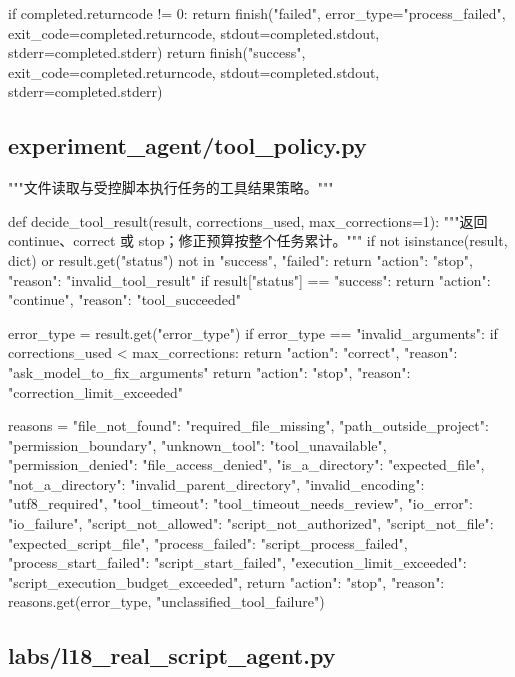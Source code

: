 \documentclass[UTF8,zihao=-4,fontset=fandol]{ctexart}
\begin{document}
\begin{Code}
    if completed.returncode != 0:
        return finish("failed", error_type="process_failed", exit_code=completed.returncode,
                      stdout=completed.stdout, stderr=completed.stderr)
    return finish("success", exit_code=completed.returncode,
                  stdout=completed.stdout, stderr=completed.stderr)
\end{Code}

\subsection{experiment\_agent/tool\_policy.py}

\begin{Code}
"""文件读取与受控脚本执行任务的工具结果策略。"""


def decide_tool_result(result, corrections_used, max_corrections=1):
    """返回 continue、correct 或 stop；修正预算按整个任务累计。"""
    if not isinstance(result, dict) or result.get("status") not in {"success", "failed"}:
        return {"action": "stop", "reason": "invalid_tool_result"}
    if result["status"] == "success":
        return {"action": "continue", "reason": "tool_succeeded"}

    error_type = result.get("error_type")
    if error_type == "invalid_arguments":
        if corrections_used < max_corrections:
            return {"action": "correct", "reason": "ask_model_to_fix_arguments"}
        return {"action": "stop", "reason": "correction_limit_exceeded"}

    reasons = {
        "file_not_found": "required_file_missing",
        "path_outside_project": "permission_boundary",
        "unknown_tool": "tool_unavailable",
        "permission_denied": "file_access_denied",
        "is_a_directory": "expected_file",
        "not_a_directory": "invalid_parent_directory",
        "invalid_encoding": "utf8_required",
        "tool_timeout": "tool_timeout_needs_review",
        "io_error": "io_failure",
        "script_not_allowed": "script_not_authorized",
        "script_not_file": "expected_script_file",
        "process_failed": "script_process_failed",
        "process_start_failed": "script_start_failed",
        "execution_limit_exceeded": "script_execution_budget_exceeded",
    }
    return {"action": "stop", "reason": reasons.get(error_type, "unclassified_tool_failure")}
\end{Code}

\subsection{labs/l18\_real\_script\_agent.py}
\end{document}
